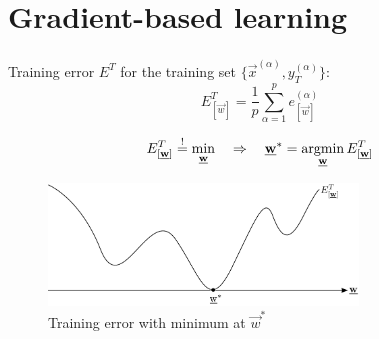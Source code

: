 \section{Gradient-based learning}

\begin{frame}\frametitle{\secname}
	Training error $E^T$ for the training set $\{\vec x^{(\alpha)}, y^{(\alpha)}_{T}\}$: 
    \begin{equation}
        E_{[\vec{w}]}^T = \frac{1}{p} \sum\limits_{\alpha = 1}^p 
					e_{[\vec{w}]}^{(\alpha)}
    \end{equation}
    
    
    \begin{equation}
        E_{[\vec{w}]}^T \eqexcl \min_{\vec w} \quad \Rightarrow \quad \vec w^{*} = \argmin_{\vec w} E_{[\vec{w}]}^T
    \end{equation}

    \begin{figure}[h]
        \centering
        \includegraphics[height=3.25cm]{img/section1_fig19_no_steps}
        \caption{Training error with minimum at $\vec w^{*}$}
        \label{fig:training_error} 
    \end{figure}
    
    \pause 
    
    

    
    
\end{frame}

